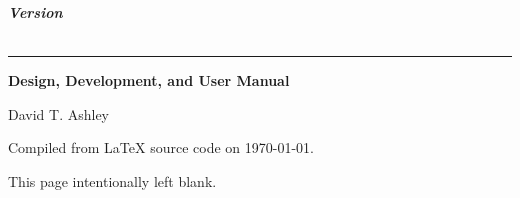 \thispagestyle{empty}

\begin{flushright}
\vspace*{0mm}
\huge\bfseries
\emph{\productbasenameshort{} Version \productversion{}}\\
\vspace{1.0cm}
\emph{\productdesctitle{}}\\
\end{flushright}
\vspace{0.0cm}
\noindent\rule{\textwidth}{2pt}
\begin{flushright}
\LARGE\bfseries
Design, Development, and User Manual
\end{flushright}
\vfill
\begin{flushright}
\begin{small}
David T. Ashley
\end{small}
\end{flushright}
\vspace{0.2cm}
\begin{flushright}
\begin{small}
Compiled from \LaTeX{} source code on \today .  
\end{small}
\end{flushright}

\pagebreak
\thispagestyle{empty}
\begin{centering}
This page intentionally left blank.
\end{centering}
\vfill

